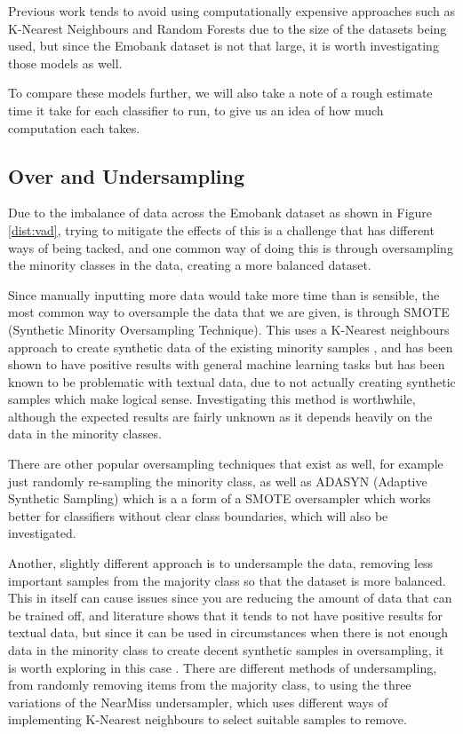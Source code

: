 Previous work tends to avoid using computationally expensive approaches such as K-Nearest Neighbours and Random Forests due to the size of the datasets being used, but since the Emobank dataset is not that large, it is worth investigating those models as well.

To compare these models further, we will also take a note of a rough estimate time it take for each classifier to run, to give us an idea of how much computation each takes.

\subsection{Over and Undersampling}

Due to the imbalance of data across the Emobank dataset as shown in Figure \ref{dist:vad}, trying to mitigate the effects of this is a challenge that has different ways of being tacked, and one common way of doing this is through oversampling the minority classes in the data, creating a more balanced dataset. \cite{towardsDS}

Since manually inputting more data would take more time than is sensible, the most common way to oversample the data that we are given, is through SMOTE (Synthetic Minority Oversampling Technique). This uses a K-Nearest neighbours approach to create synthetic data of the existing minority samples , and has been shown to have positive results with general machine learning tasks but has been known to be problematic with textual data, due to not actually creating synthetic samples which make logical sense. Investigating this method is worthwhile, although the expected results are fairly unknown as it depends heavily on the data in the minority classes.

There are other popular oversampling techniques that exist as well, for example just randomly re-sampling the minority class, as well as ADASYN (Adaptive Synthetic Sampling) which is a a form of a SMOTE oversampler which works better for classifiers without clear class boundaries, which will also be investigated.

Another, slightly different approach is to undersample the data, removing less important samples from the majority class so that the dataset is more balanced. This in itself can cause issues since you are reducing the amount of data that can be trained off, and literature shows that it tends to not have positive results for textual data, but since it can be used in circumstances when there is not enough data in the minority class to create decent synthetic samples in oversampling, it is worth exploring in this case \cite{more2016survey}. There are different methods of undersampling, from randomly removing items from the majority class, to using the three variations of the NearMiss undersampler, which uses different ways of implementing K-Nearest neighbours to select suitable samples to remove. 

